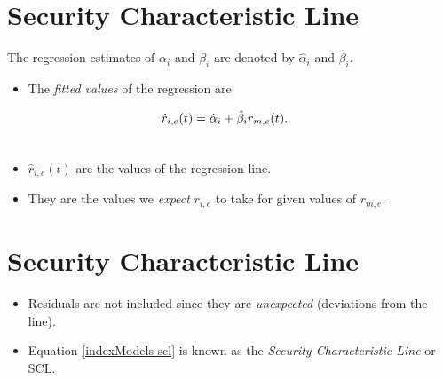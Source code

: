\documentclass[letterpaper,10pt,english]{sphinxmanual}
\begin{document}
\section{Security Characteristic Line}
\label{indexModels:security-characteristic-line}
The regression estimates of $\alpha_i$ and $\beta_i$ are denoted by
$\hat{\alpha}_i$ and $\hat{\beta}_i$.
\begin{itemize}
\item {} 
The \emph{fitted values} of the regression are

\end{itemize}
\label{indexModels:equation-scl}\begin{gather}
\begin{split}\hat{r}_{i,e}(t) & = \hat{\alpha}_i + \hat{\beta}_i r_{m,e}(t).\end{split}\label{indexModels-scl}\\\begin{split}\end{split}\notag
\end{gather}\begin{itemize}
\item {} 
$\hat{r}_{i,e}(t)$ are the values of the regression line.

\end{itemize}
\begin{itemize}
\item {} 
They are the values we \emph{expect} $r_{i,e}$ to take for given
values of $r_{m,e}$.

\end{itemize}


\section{Security Characteristic Line}
\label{indexModels:id6}\begin{itemize}
\item {} 
Residuals are not included since they are \emph{unexpected} (deviations
from the line).

\end{itemize}
\begin{itemize}
\item {} 
Equation \eqref{indexModels-scl} is known as the \emph{Security Characteristic Line} or
SCL.

\end{itemize}
\end{document}
